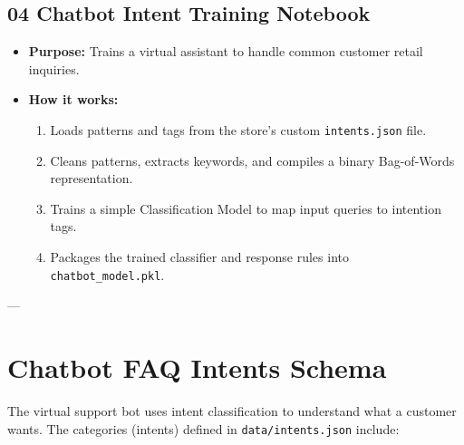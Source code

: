 \documentclass[12pt,a4paper]{article}
\begin{document}
\subsection{04 Chatbot Intent Training Notebook}
\begin{itemize}
    \item \textbf{Purpose:} Trains a virtual assistant to handle common customer retail inquiries.
    \item \textbf{How it works:}
        \begin{enumerate}
            \item Loads patterns and tags from the store's custom \texttt{intents.json} file.
            \item Cleans patterns, extracts keywords, and compiles a binary Bag-of-Words representation.
            \item Trains a simple Classification Model to map input queries to intention tags.
            \item Packages the trained classifier and response rules into \texttt{chatbot\_model.pkl}.
        \end{enumerate}
\end{itemize}

---

\section{Chatbot FAQ Intents Schema}
The virtual support bot uses intent classification to understand what a customer wants. The categories (intents) defined in \texttt{data/intents.json} include:
\end{document}
